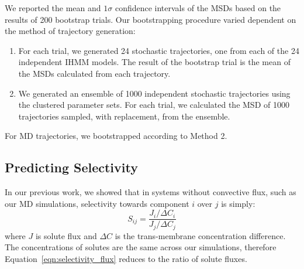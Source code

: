\documentclass[journal=jpcbfk,manuscript=article]{achemso}
\begin{document}
  We reported the mean and $1 \sigma$ confidence intervals of the MSDs based on the 
  results of 200 bootstrap trials. Our bootstrapping procedure varied dependent on the
  method of trajectory generation:
  \begin{enumerate}[label={Method \theenumi :}, leftmargin=3.5\parindent]
  	\item For each trial, we generated 24 stochastic trajectories, one from each of
  	the 24 independent IHMM models. The result of the bootstrap trial is the mean
  	of the MSDs calculated from each trajectory. 
    \item We generated an ensemble of 1000 independent stochastic trajectories using
    the clustered parameter sets. For each trial, we calculated the MSD of 1000 
    trajectories sampled, with replacement, from the ensemble.
  \end{enumerate}
  
  For MD trajectories, we bootstrapped according to Method 2.
  
  \subsection{Predicting Selectivity}\label{method:selectivity}
  
  In our previous work, we showed that in systems without convective flux, such
  as our MD simulations, selectivity towards component $i$ over $j$ is simply:
  \begin{equation}
  S_{ij} = \frac{J_i / \Delta C_i}{J_j / \Delta C_j}
  \label{eqn:selectivity_flux}
  \end{equation}
  where $J$ is solute flux and $\Delta C$ is the trans-membrane concentration
  difference.~\cite{coscia_capturing_2020} The concentrations of solutes are the
  same across our simulations, therefore Equation~\ref{eqn:selectivity_flux} 
  reduces to the ratio of solute fluxes. 
  
\end{document}
